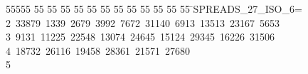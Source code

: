 %
%
\begin{tabbing}
55555 \= 55 \= 55 \= 55 \= 55 \= 55 \= 55 \= 55 \= 55 \= 55 \= 55 \= 55 \= 55 \= \>SPREADS\_27\_ISO\_6=\\[0pt]
2\ 33879\ 1339\ 2679\ 3992\ 7672\ 31140\ 6913\ 13513\ 23167\ 5653\ \\[0pt]
3\ 9131\ 11225\ 22548\ 13074\ 24645\ 15124\ 29345\ 16226\ 31506\ \\[0pt]
4\ 18732\ 26116\ 19458\ 28361\ 21571\ 27680\\[0pt]
5\>\end{tabbing}
